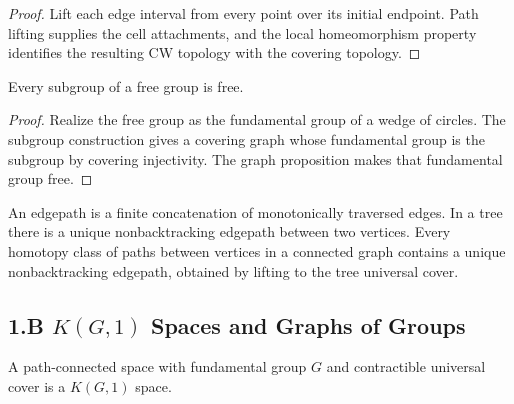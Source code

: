 \begin{proof}
\sketch Lift each edge interval from every point over its initial endpoint.
Path lifting supplies the cell attachments, and the local homeomorphism
property identifies the resulting CW topology with the covering topology.
\end{proof}

\begin{theorem}
\label{thm:subgroup-of-free-group-is-free}
\leanok
{}
Every subgroup of a free group is free.
\end{theorem}

\begin{proof}
\leanok
\sketch Realize the free group as the fundamental group of a wedge of circles.
The subgroup construction gives a covering graph whose fundamental group is
the subgroup by covering injectivity. The graph proposition makes that
fundamental group free.
\end{proof}

\begin{definition}[Edgepath]
\label{def:edgepath}
An edgepath is a finite concatenation of monotonically traversed edges. In a
tree there is a unique nonbacktracking edgepath between two vertices. Every
homotopy class of paths between vertices in a connected graph contains a
unique nonbacktracking edgepath, obtained by lifting to the tree universal
cover.
\end{definition}

\subsection{1.B $K(G,1)$ Spaces and Graphs of Groups}
\label{sec:kg1-spaces-graphs-of-groups}

\begin{definition}[$K(G,1)$ space]
\label{def:k-g-1-space}
\leanok
{}
A path-connected space with fundamental group $G$ and contractible universal
cover is a $K(G,1)$ space.
\end{definition}

